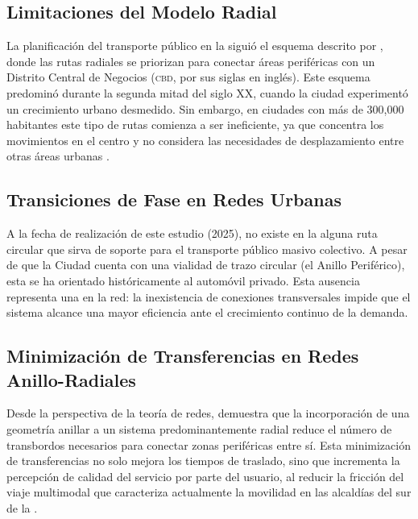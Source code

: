 \subsection{Limitaciones del Modelo Radial}
\label{subsec:limitaciones-radial}

La planificación del transporte público en la \cdmx{} siguió el esquema descrito
por
\citet{molinero2002}, donde las rutas radiales se priorizan para conectar
áreas
periféricas con un Distrito Central de Negocios (\textsc{cbd}, por sus siglas en
inglés). Este esquema predominó durante la segunda mitad del siglo XX, cuando la
ciudad experimentó un crecimiento urbano desmedido. Sin embargo, en ciudades
con más de 300,000 habitantes este tipo de rutas comienza a ser ineficiente, ya
que
concentra los movimientos en el centro y no considera las necesidades de
desplazamiento entre otras áreas urbanas \citep{molinero2002}.

\subsection{Transiciones de Fase en Redes Urbanas}
\label{subsec:transiciones-fase}

A la fecha de realización de este estudio (2025), no existe en la \cdmx{} alguna
ruta
circular que sirva de soporte para el transporte público masivo colectivo. A
pesar de
que la Ciudad cuenta con una vialidad de trazo circular (el Anillo Periférico),
esta
se ha orientado históricamente al automóvil privado. Esta ausencia representa
una
 en la red: la inexistencia de conexiones
transversales
impide que el sistema alcance una mayor eficiencia ante el crecimiento continuo
de
la demanda.

\subsection{Minimización de Transferencias en Redes Anillo-Radiales}
\label{subsec:minimizacion-transferencias}

Desde la perspectiva de la teoría de redes, \citet{owais2020} demuestra que
la
incorporación de una geometría anillar a un sistema predominantemente radial
reduce
el número de transbordos necesarios para conectar zonas periféricas entre sí.
Esta
minimización de transferencias no solo mejora los tiempos de traslado, sino que
incrementa la percepción de calidad del servicio por parte del usuario, al
reducir la
fricción del viaje multimodal que caracteriza actualmente la movilidad en las
alcaldías
del sur de la \cdmx{}.

